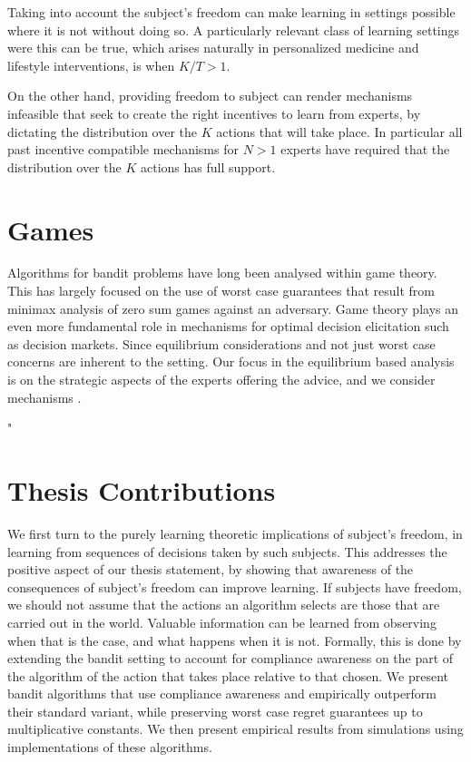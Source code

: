 Taking into account the subject's freedom can make learning in settings possible where it is not without doing so.
A particularly relevant class of learning settings were this can be true, which arises naturally in personalized medicine and lifestyle interventions, is when $K/T > 1$.

On the other hand, providing freedom to subject can render mechanisms infeasible that seek to create the right incentives to learn from experts, by dictating the distribution over the $K$ actions that will take place.
In particular all past incentive compatible mechanisms for $N>1$ experts have required that the distribution over the $K$ actions has full support.


\section{Games}

Algorithms for bandit problems have long been analysed within game theory.
This has largely focused on the use of worst case guarantees that result from minimax analysis of zero sum games against an adversary.
Game theory plays an even more fundamental role in mechanisms for optimal decision elicitation such as decision markets.
Since equilibrium considerations and not just worst case concerns are inherent to the setting.
Our focus in the equilibrium based analysis is on the strategic aspects of the experts offering the advice, and we consider mechanisms .


"%

\section{Thesis Contributions}

We first turn to the purely learning theoretic implications of subject's freedom, in learning from sequences of decisions taken by such subjects.
This addresses the positive aspect of our thesis statement, by showing that awareness of the consequences of subject's freedom can improve learning.
If subjects have freedom, we should not assume that the actions an algorithm selects are those that are carried out in the world.
Valuable information can be learned from observing when that is the case, and what happens when it is not.
Formally, this is done by extending the bandit setting to account for compliance awareness on the part of the algorithm of the action that takes place relative to that chosen.
We present bandit algorithms that use compliance awareness and empirically outperform their standard variant, while preserving worst case regret guarantees up to multiplicative constants.
We then present empirical results from simulations using implementations of these algorithms.

